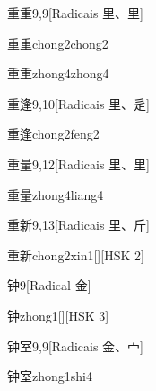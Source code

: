 \begin{entry}{重重}{9,9}[Radicais ⾥、⾥]
  \begin{phonetics}{重重}{chong2chong2}
  \end{phonetics}
  \begin{phonetics}{重重}{zhong4zhong4}
  \end{phonetics}
\end{entry}

\begin{entry}{重逢}{9,10}[Radicais ⾥、⾡]
  \begin{phonetics}{重逢}{chong2feng2}
  \end{phonetics}
\end{entry}

\begin{entry}{重量}{9,12}[Radicais ⾥、⾥]
  \begin{phonetics}{重量}{zhong4liang4}
  \end{phonetics}
\end{entry}

\begin{entry}{重新}{9,13}[Radicais ⾥、⽄]
  \begin{phonetics}{重新}{chong2xin1}[][HSK 2]
  \end{phonetics}
\end{entry}

\begin{entry}{钟}{9}[Radical ⾦]
  \begin{phonetics}{钟}{zhong1}[][HSK 3]
  \end{phonetics}
\end{entry}

\begin{entry}{钟室}{9,9}[Radicais ⾦、⼧]
  \begin{phonetics}{钟室}{zhong1shi4}
  \end{phonetics}
\end{entry}

